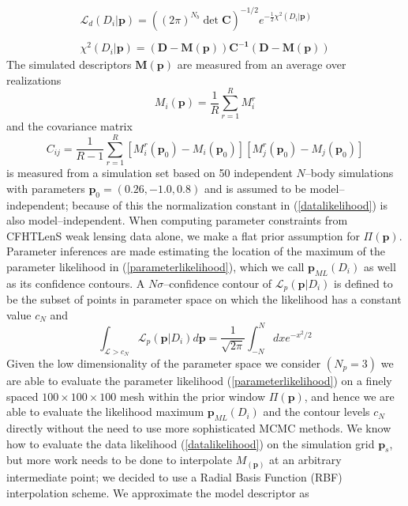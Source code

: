 \documentclass[reprint,aps,prd,superscriptaddress,showkeys,showpacs]{revtex4-1}
\begin{document}
\begin{equation}
\label{datalikelihood}
\begin{matrix}
\mathcal{L}_d(D_i\vert \mathbf{p}) = ((2\pi)^{N_b}\det{\mathbf{C}})^{-1/2} e^{-\frac{1}{2}\chi^2(D_i\vert \mathbf{p})} \\ \\
\chi^2(D_i\vert \mathbf{p}) = \mathbf{(D - M(p))C^{-1}(D-M(p))}
\end{matrix}
\end{equation} 
%
The simulated descriptors $\mathbf{M(p)}$ are measured from an average over realizations
\begin{equation}
M_i(\mathbf{p}) = \frac{1}{R}\sum_{r=1}^R M_i^r 
\end{equation}
%
and the covariance matrix 
\begin{equation}
\label{datacov}
C_{ij} = \frac{1}{R-1} \sum_{r=1}^R [M_i^r(\mathbf{p}_0)-M_i(\mathbf{p}_0)][M_j^r(\mathbf{p}_0)-M_j(\mathbf{p}_0)]
\end{equation}
%
is measured from a simulation set based on 50 independent $N$--body simulations with parameters $\mathbf{p}_0=(0.26,-1.0,0.8)$ and is assumed to be model--independent; because of this the normalization constant in (\ref{datalikelihood}) is also model--independent. When computing parameter constraints from CFHTLenS weak lensing data alone, we make a flat prior assumption for $\Pi(\mathbf{p})$. Parameter inferences are made estimating the location of the maximum of the parameter likelihood in (\ref{parameterlikelihood}), which we call $\mathbf{p}_{ML}(D_i)$ as well as its confidence contours. A $N\sigma$--confidence contour of $\mathcal{L}_p(\mathbf{p}\vert D_i)$ is defined to be the subset of points in parameter space on which the likelihood has a constant value $c_N$ and 
\begin{equation}
\label{ennesigma}
\int_{\mathcal{L}>c_N} \mathcal{L}_p(\mathbf{p}\vert D_i) d\mathbf{p} = \frac{1}{\sqrt{2\pi}}\int_{-N}^N dx e^{-x^2/2}
\end{equation}
%
Given the low dimensionality of the parameter space we consider $(N_p=3)$ we are able to evaluate the parameter likelihood (\ref{parameterlikelihood}) on a finely spaced $100\times100\times100$ mesh within the prior window $\Pi(\mathbf{p})$, and hence we are able to evaluate the likelihood maximum $\mathbf{p}_{ML}(D_i)$ and the contour levels $c_N$ directly without the need to use more sophisticated MCMC methods. We know how to evaluate the data likelihood (\ref{datalikelihood}) on the simulation grid $\mathbf{p}_s$, but more work needs to be done to interpolate $M_(\mathbf{p})$ at an arbitrary intermediate point; we decided to use a Radial Basis Function (RBF) interpolation scheme. We approximate the model descriptor as
\end{document}
